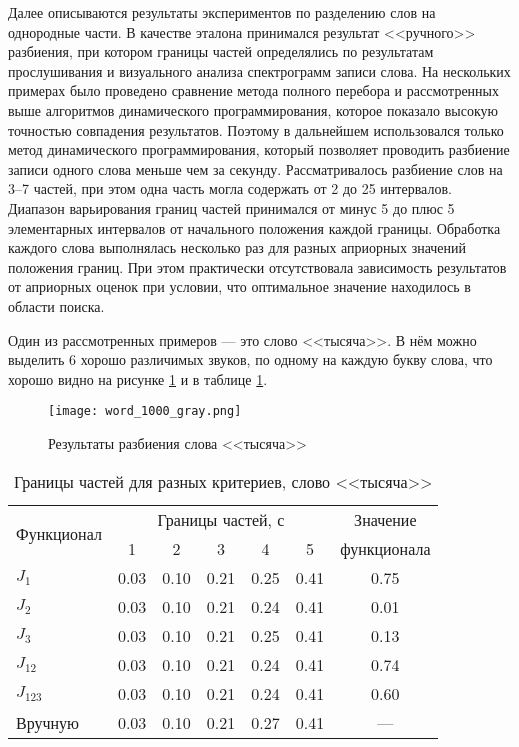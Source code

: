 Далее описываются результаты экспериментов по разделению слов на однородные части.
В качестве эталона принимался результат <<ручного>> разбиения, при котором границы частей определялись по результатам прослушивания и визуального анализа спектрограмм записи слова.
На нескольких примерах было проведено сравнение метода полного перебора и рассмотренных выше алгоритмов динамического программирования, которое показало высокую точностью совпадения результатов.
Поэтому в дальнейшем использовался только метод динамического программирования, который позволяет проводить разбиение записи одного слова меньше чем за секунду.
Рассматривалось разбиение слов на 3--7 частей, при этом одна часть могла содержать от 2 до 25 интервалов.
Диапазон варьирования границ частей принимался от минус 5 до плюс 5 элементарных интервалов от начального положения каждой границы.
Обработка каждого слова выполнялась несколько раз для разных априорных значений положения границ.
При этом практически отсутствовала зависимость результатов от априорных оценок при условии, что оптимальное значение находилось в области поиска. 

Один из рассмотренных примеров --- это слово <<тысяча>>.
В нём можно выделить 6 хорошо различимых звуков, по одному на каждую букву слова, что хорошо видно на рисунке \ref{fig:3_1} и в таблице \ref{tab:3_1}.
\begin{figure}[h]
	\centering
	\texttt{[image: word\_1000\_gray.png]}
	\caption{Результаты разбиения слова <<тысяча>>}
	\label{fig:3_1}
\end{figure}

\begin{table}[h]
	\centering
	\caption{Границы частей для разных критериев, слово <<тысяча>>}
	\label{tab:3_1}
	\begin{tabular}{| l | c | c | c | c | c | c |}
		\hline
		\multirow{2}{*}{Функционал} & \multicolumn{5}{c|}{Границы частей, с} & Значение \\
		\hhline{~-----~} & \phantom{00}1\phantom{00} & \phantom{00}2\phantom{00} & \phantom{00}3\phantom{00} & \phantom{00}4\phantom{00} & \phantom{00}5\phantom{00} & \phantom{0}функционала\phantom{0} \\
		\hline
		$J_{1}$		& 0.03 & 0.10 & 0.21 & 0.25 & 0.41 & 0.75 \\
		$J_{2}$		& 0.03 & 0.10 & 0.21 & 0.24 & 0.41 & 0.01 \\
		$J_{3}$		& 0.03 & 0.10 & 0.21 & 0.25 & 0.41 & 0.13 \\
		$J_{12}$	& 0.03 & 0.10 & 0.21 & 0.24 & 0.41 & 0.74 \\
		$J_{123}$	& 0.03 & 0.10 & 0.21 & 0.24 & 0.41 & 0.60 \\
		\hline
		Вручную		& 0.03 & 0.10 & 0.21 & 0.27 & 0.41 & --- \\
		\hline
	\end{tabular}
\end{table}

